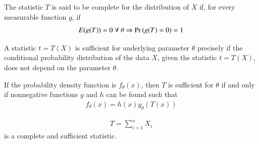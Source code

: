 \documentclass[journal,12pt,twocolumn]{IEEEtran}
\begin{document}
\begin{definition}
The statistic $T$ is said to be complete for the distribution of $X$ if, for every measurable function $g$, if
\begin{align}
E(g(T)) = 0 \; \forall \; \theta \Rightarrow \Pr\left(g(T)=0\right) = 1 
\end{align}
\end{definition}
\begin{definition}
A statistic $t = T(X)$ is sufficient for underlying parameter $\theta$ precisely if the conditional probability distribution of the data $X$, given the statistic $t = T(X)$, does not depend on the parameter $\theta$. 
\end{definition}
\begin{theorem}
If the probability density function is $f_\theta (x)$, then $T$ is sufficient for $\theta$ if and only if nonnegative functions $g$ and $h$ can be found such that
\begin{align}
f_\theta (x) = h(x)g_\theta(T(x))
\end{align}
\end{theorem}
\begin{lemma} \label{lemma_sufficient_complete}
\begin{align}
T = \sum_{i=1}^{n} X_i
\end{align}
is a complete and sufficient statistic. 
\end{lemma}
\end{document}
